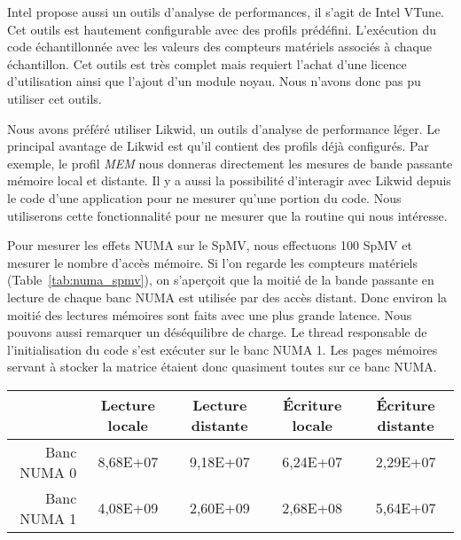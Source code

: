 Intel propose aussi un outils d'analyse de performances, il s'agit de Intel VTune.
%
Cet outils est hautement configurable avec des profils prédéfini.
%
L'exécution du code échantillonnée avec les valeurs des compteurs matériels associés à chaque échantillon.
%
Cet outils est très complet mais requiert l'achat d'une licence d'utilisation ainsi que l'ajout d'un module noyau.
%
Nous n'avons donc pas pu utiliser cet outils.



Nous avons préféré utiliser Likwid, un outils d'analyse de performance léger.
%
Le principal avantage de Likwid est qu'il contient des profils déjà configurés.
%
Par exemple, le profil {\em MEM} nous donneras directement les mesures de bande passante mémoire local et distante.
%
Il y a aussi la possibilité d'interagir avec Likwid depuis le code d'une application pour ne mesurer qu'une portion du code.
%
Nous utiliserons cette fonctionnalité pour ne mesurer que la routine qui nous intéresse.


Pour mesurer les effets NUMA sur le SpMV, nous effectuons 100 SpMV et mesurer le nombre d'accès mémoire.
%
Si l'on regarde les compteurs matériels (Table~\ref{tab:numa_spmv}), on s'aperçoit que la moitié de la bande passante en lecture de chaque banc NUMA est utilisée par des accès distant.
%
Donc environ la moitié des lectures mémoires sont faits avec une plus grande latence.
%
Nous pouvons aussi remarquer un déséquilibre de charge.
%
Le thread responsable de l'initialisation du code s'est exécuter sur le banc NUMA 1.
%
Les pages mémoires servant à stocker la matrice étaient donc quasiment toutes sur ce banc NUMA.



\begin{center}
  \begin{tabular}{|r|c|c|c|c|}
    \hline
                & Lecture locale & Lecture distante & \'Ecriture locale & \'Ecriture distante \\
    \hline
    Banc NUMA 0 & 8,68E+07  &  9,18E+07  &  6,24E+07  &  2,29E+07 \\
    Banc NUMA 1 & 4,08E+09  &  2,60E+09  &  2,68E+08  &  5,64E+07 \\
    \hline
  \end{tabular}
  \label{tab:numa_spmv}
\end{center}
